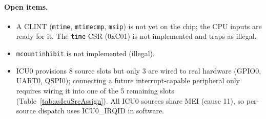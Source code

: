 \paragraph{Open items.}
\begin{itemize}
  \item A CLINT (\texttt{mtime}, \texttt{mtimecmp}, \texttt{msip}) is not
    yet on the chip; the CPU inputs are ready for it. The \texttt{time}
    CSR (0xC01) is not implemented and traps as illegal.
  \item \texttt{mcountinhibit} is not implemented (illegal).
  \item ICU0 provisions 8 source slots but only 3 are wired to real
    hardware (GPIO0, UART0, QSPI0); connecting a future interrupt-capable peripheral only requires
    wiring it into one of the 5 remaining slots
    (Table~\ref{tab:asIcuSrcAssign}). All ICU0 sources share MEI
    (cause 11), so per-source dispatch uses ICU0\_IRQID in software.
\end{itemize}

